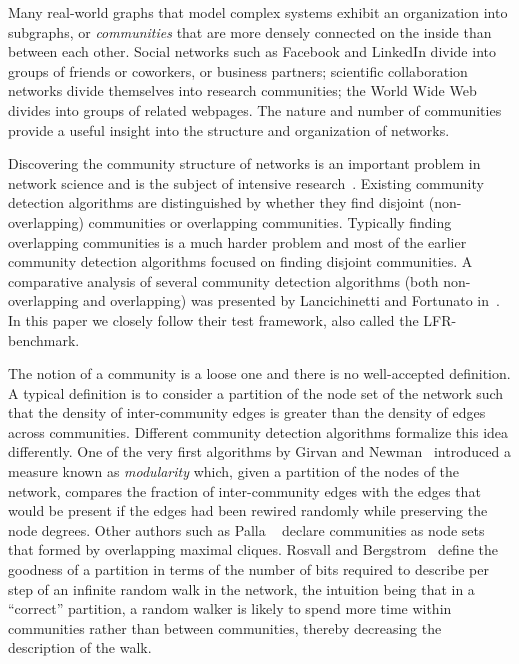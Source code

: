 Many real-world graphs that model complex systems exhibit an organization 
into subgraphs, or \textit{communities} that are more densely connected on the inside than between each other. 
Social networks such as Facebook and LinkedIn divide into groups of friends 
or coworkers, or business partners; scientific collaboration networks divide 
themselves into research communities; the World Wide Web divides into groups 
of related webpages. The nature and number of communities provide 
a useful insight into the structure and organization of networks. 

Discovering the community structure of networks is an 
important problem in network science and is the subject 
of intensive research~\cite{GN02, GN04, CNM04, RCC04, DM04, PDFV05, NL07, 
BGLL08, RB08, RN09}. Existing community detection algorithms are 
distinguished by whether they find disjoint (non-overlapping) 
communities or overlapping communities. Typically finding 
overlapping communities is a much harder problem and most of the 
earlier community detection algorithms focused on finding disjoint 
communities. A comparative analysis of several community detection algorithms 
(both non-overlapping and overlapping) was presented by Lancichinetti and Fortunato 
in~\cite{LF09}. 
In this paper we closely follow their test framework, also called the LFR-benchmark.

The notion of a community is a loose one and there is no well-accepted definition.
A typical definition is to consider a partition of the node set of the network 
such that the density of inter-community edges is greater than the density of edges 
across communities. Different community detection algorithms formalize this
idea differently. One of the very first algorithms by
Girvan and Newman~\cite{GN02} introduced a measure known as \textit{modularity}
which, given a partition of the nodes of the network, compares the fraction of 
inter-community edges with the edges that would be present if the edges had been 
rewired randomly while preserving the node degrees. Other authors such as Palla 
\etal~\cite{PDFV05} declare communities as node sets that formed 
by overlapping maximal cliques. Rosvall and Bergstrom~\cite{RB08} 
define the goodness of a partition in terms of the number of bits required to 
describe per step of an infinite random walk in the network, the intuition being 
that in a ``correct'' partition, a random walker is likely to spend more time 
within communities rather than between communities, thereby decreasing the 
description of the walk.  

